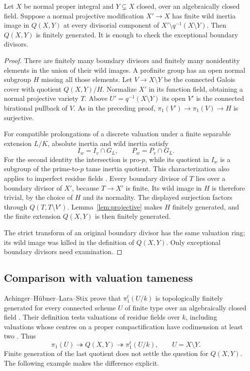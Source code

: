 \begin{proposition}\label{prop:finite-wild}
Let $X$ be normal proper integral and $Y\subsetneq X$ closed,
over an algebraically closed field. Suppose a normal projective
modification $X'\to X$ has finite wild inertia image in $Q(X,Y)$
at every divisorial component of $X'\setminus q^{-1}(X\setminus Y)$.
Then $Q(X,Y)$ is finitely generated. It is enough to check the
exceptional boundary divisors.
\end{proposition}
\begin{proof}
There are finitely many boundary divisors and finitely many
nonidentity elements in the union of their wild images. A
profinite group has an open normal subgroup $H$ missing all
those elements. Let $V\to X\setminus Y$ be the connected Galois
cover with quotient $Q(X,Y)/H$. Normalize $X'$ in its function
field, obtaining a normal projective variety $T$. Above
$U'=q^{-1}(X\setminus Y)$ its open $V'$ is the connected
birational pullback of $V$. As in the preceding proof,
$\pi_1(V')\to\pi_1(V)\to H$ is surjective.

For compatible prolongations of a discrete valuation under a
finite separable extension $L/K$, absolute inertia and wild
inertia satisfy
\[
 I_w=I_v\cap G_L,\qquad P_w=P_v\cap G_L.
\]
For the second identity the intersection is pro-$p$, while its
quotient in $I_w$ is a subgroup of the prime-to-$p$ tame inertia
quotient. This characterization also applies to imperfect
residue fields \cite[Tag 0BUA, Lemma 58.13.5]{Stacks}.
Every boundary divisor of $T$ lies over a boundary divisor of
$X'$, because $T\to X'$ is finite. Its wild image in $H$ is
therefore trivial, by the choice of $H$ and its normality.
The displayed surjection factors through $Q(T,T\setminus V')$.
Lemma~\ref{lem:projective} makes $H$ finitely generated, and
the finite extension $Q(X,Y)$ is then finitely generated.

The strict transform of an original boundary divisor has the
same valuation ring; its wild image was killed in the definition
of $Q(X,Y)$. Only exceptional boundary divisors need examination.
\end{proof}

\subsection{Comparison with valuation tameness}
Achinger--H\"ubner--Lara--Stix prove that $\pi_1^t(U/k)$ is
topologically finitely generated for every connected scheme $U$
of finite type over an algebraically closed field
\cite[Theorem 2.6.1, p.~23]{AHLS}. Their definition tests
valuations of residue fields over $k$, including valuations whose
centres on a proper compactification have codimension at least two
\cite[Definitions 2.2.1--2.2.2, p.~12]{AHLS}. Thus
\[
 \pi_1(U)\twoheadrightarrow Q(X,Y)
 \twoheadrightarrow\pi_1^t(U/k),\qquad U=X\setminus Y.
\]
Finite generation of the last quotient does not settle the question
for $Q(X,Y)$. The following example makes the difference explicit.

